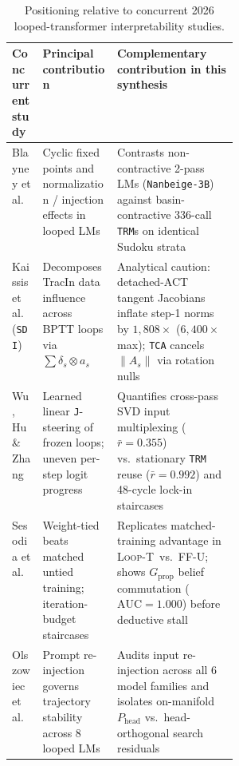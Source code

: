 \documentclass[10pt,letterpaper]{article}
\newcommand{\LoopT}{\textsc{Loop-T}}
\newcommand{\FFU}{\textsc{FF-U}}
\newcommand{\Gprop}{G_{\mathrm{prop}}}
\newcommand{\Phead}{P_{\mathrm{head}}}
\begin{document}
\begin{table}[t]
\centering
\small
\begin{tabularx}{\linewidth}{@{}l>{\raggedright\arraybackslash}p{0.33\linewidth}>{\raggedright\arraybackslash}X@{}}
\toprule
Concurrent study & Principal contribution & Complementary contribution in this synthesis \\
\midrule
Blayney et al.\ \cite{blayney2026mechanistic} & Cyclic fixed points and normalization / injection effects in looped LMs & Contrasts non-contractive 2-pass LMs (\texttt{Nanbeige-3B}) against basin-contractive 336-call \texttt{TRM}s on identical Sudoku strata \\
Kaissis et al.\ (\texttt{SDI}) \cite{kaissis2026sdi} & Decomposes TracIn data influence across BPTT loops via $\sum \delta_s \otimes a_s$ & Analytical caution: detached-ACT tangent Jacobians inflate step-1 norms by $1{,}808\times$ ($6{,}400\times$ max); \texttt{TCA} cancels $\|A_s\|$ via rotation nulls \\
Wu, Hu \& Zhang \cite{wu2026shared} & Learned linear \texttt{J}-steering of frozen loops; uneven per-step logit progress & Quantifies cross-pass SVD input multiplexing ($\bar{r}=0.355$) vs.\ stationary \texttt{TRM} reuse ($\bar{r}=0.992$) and 48-cycle lock-in staircases \\
Sesodia et al.\ \cite{sesodia2026inside} & Weight-tied beats matched untied training; iteration-budget staircases & Replicates matched-training advantage in \LoopT\ vs.\ \FFU; shows $\Gprop$ belief commutation ($\mathrm{AUC}=1.000$) before deductive stall \\
Olszowiec et al.\ \cite{olszowiec2026monitoring} & Prompt re-injection governs trajectory stability across 8 looped LMs & Audits input re-injection across all 6 model families and isolates on-manifold $\Phead$ vs.\ head-orthogonal search residuals \\
\bottomrule
\end{tabularx}
\caption{Positioning relative to concurrent 2026 looped-transformer interpretability studies.}
\label{tab:literature}
\end{table}
\end{document}

